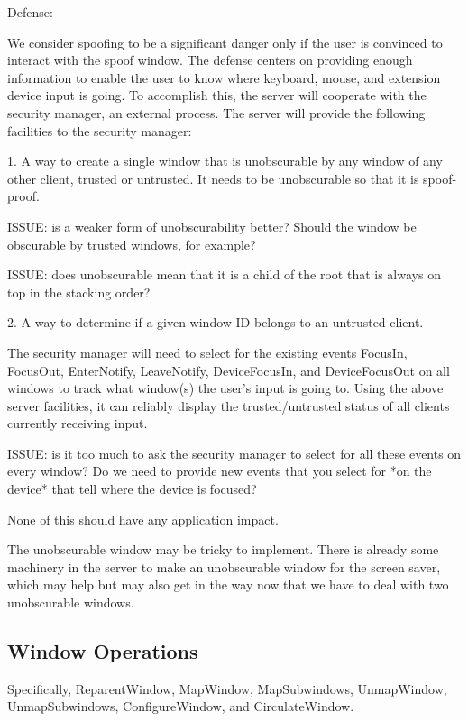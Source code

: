 Defense:

We consider spoofing to be a significant danger only if the user is
convinced to interact with the spoof window.  The defense centers on
providing enough information to enable the user to know where
keyboard, mouse, and extension device input is going.  To accomplish
this, the server will cooperate with the security manager, an external
process.  The server will provide the following facilities to the
security manager:

1.  A way to create a single window that is unobscurable by any window
of any other client, trusted or untrusted.  It needs to be
unobscurable so that it is spoof-proof.

ISSUE: is a weaker form of unobscurability better?  Should the window be
obscurable by trusted windows, for example?

ISSUE: does unobscurable mean that it is a child of the root that is
always on top in the stacking order?

2.  A way to determine if a given window ID belongs to an untrusted
client.

The security manager will need to select for the existing events
FocusIn, FocusOut, EnterNotify, LeaveNotify, DeviceFocusIn, and
DeviceFocusOut on all windows to track what window(s) the user's input
is going to.  Using the above server facilities, it can reliably
display the trusted/untrusted status of all clients currently
receiving input.

ISSUE: is it too much to ask the security manager to select for all
these events on every window?  Do we need to provide new events that
you select for *on the device* that tell where the device is focused?

None of this should have any application impact.

The unobscurable window may be tricky to implement.  There is already
some machinery in the server to make an unobscurable window for the
screen saver, which may help but may also get in the way now that we
have to deal with two unobscurable windows.



\subsection{Window Operations}

Specifically, ReparentWindow, MapWindow, MapSubwindows, UnmapWindow,
UnmapSubwindows, ConfigureWindow, and CirculateWindow.

